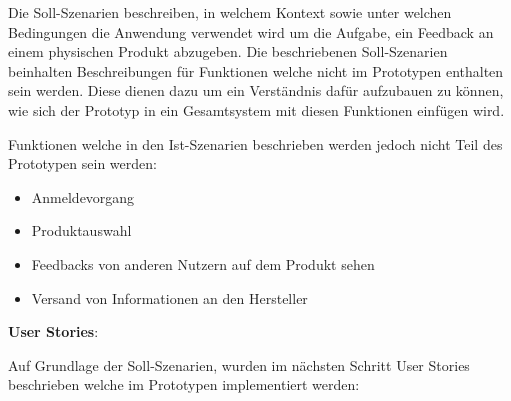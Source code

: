Die Soll-Szenarien beschreiben, in welchem Kontext sowie unter welchen Bedingungen die Anwendung verwendet wird um die Aufgabe, ein Feedback an einem physischen Produkt abzugeben. 
Die beschriebenen Soll-Szenarien beinhalten Beschreibungen für Funktionen welche nicht im Prototypen enthalten sein werden. Diese dienen dazu um ein Verständnis dafür aufzubauen zu können, wie sich der Prototyp in ein Gesamtsystem mit diesen Funktionen einfügen wird. 

Funktionen welche in den Ist-Szenarien beschrieben werden jedoch nicht Teil des Prototypen sein werden: 

\begin{itemize}
\item{Anmeldevorgang} 
\item{Produktauswahl} 
\item{Feedbacks von anderen Nutzern auf dem Produkt sehen}
\item{Versand von Informationen an den Hersteller}
\end{itemize}


\textbf{User Stories}:

Auf Grundlage der Soll-Szenarien, wurden im nächsten Schritt User Stories beschrieben welche im Prototypen implementiert werden: 

